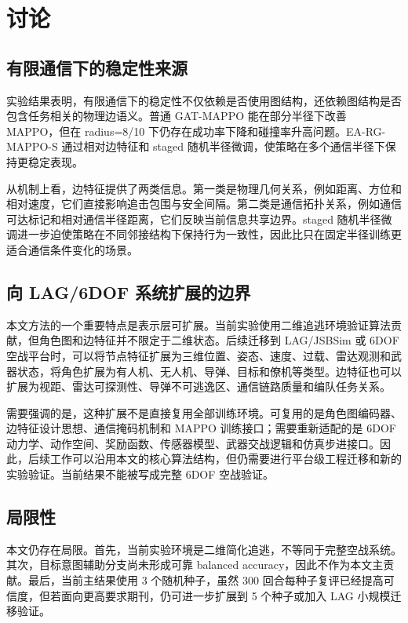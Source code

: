\section{讨论}

\subsection{有限通信下的稳定性来源}

实验结果表明，有限通信下的稳定性不仅依赖是否使用图结构，还依赖图结构是否包含任务相关的物理边语义。普通 GAT-MAPPO 能在部分半径下改善 MAPPO，但在 radius=8/10 下仍存在成功率下降和碰撞率升高问题。EA-RG-MAPPO-S 通过相对边特征和 staged 随机半径微调，使策略在多个通信半径下保持更稳定表现。

从机制上看，边特征提供了两类信息。第一类是物理几何关系，例如距离、方位和相对速度，它们直接影响追击包围与安全间隔。第二类是通信拓扑关系，例如通信可达标记和相对通信半径距离，它们反映当前信息共享边界。staged 随机半径微调进一步迫使策略在不同邻接结构下保持行为一致性，因此比只在固定半径训练更适合通信条件变化的场景。

\subsection{向 LAG/6DOF 系统扩展的边界}

本文方法的一个重要特点是表示层可扩展。当前实验使用二维追逃环境验证算法贡献，但角色图和边特征并不限定于二维状态。后续迁移到 LAG/JSBSim 或 6DOF 空战平台时，可以将节点特征扩展为三维位置、姿态、速度、过载、雷达观测和武器状态，将角色扩展为有人机、无人机、导弹、目标和僚机等类型。边特征也可以扩展为视距、雷达可探测性、导弹不可逃逸区、通信链路质量和编队任务关系。

需要强调的是，这种扩展不是直接复用全部训练环境。可复用的是角色图编码器、边特征设计思想、通信掩码机制和 MAPPO 训练接口；需要重新适配的是 6DOF 动力学、动作空间、奖励函数、传感器模型、武器交战逻辑和仿真步进接口。因此，后续工作可以沿用本文的核心算法结构，但仍需要进行平台级工程迁移和新的实验验证。当前结果不能被写成完整 6DOF 空战验证。

\subsection{局限性}

本文仍存在局限。首先，当前实验环境是二维简化追逃，不等同于完整空战系统。其次，目标意图辅助分支尚未形成可靠 balanced accuracy，因此不作为本文主贡献。最后，当前主结果使用 3 个随机种子，虽然 300 回合每种子复评已经提高可信度，但若面向更高要求期刊，仍可进一步扩展到 5 个种子或加入 LAG 小规模迁移验证。
